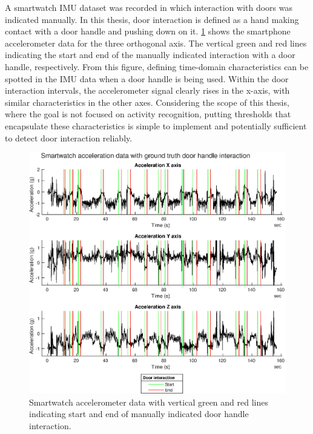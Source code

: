 A smartwatch \ac{IMU} dataset was recorded in which interaction with doors was indicated manually. In this thesis, door interaction is defined as a hand making contact with a door handle and pushing down on it.
\cref{fig:smartwatch_acc_with_gt_door_and_door_detect} shows the smartphone accelerometer data for the three orthogonal axis. The vertical green and red lines indicating the start and end of the manually indicated interaction with a door handle, respectively. From this figure, defining time-domain characteristics can be spotted in the \ac{IMU} data when a door handle is being used. Within the door interaction intervals, the accelerometer signal clearly rises in the x-axis, with similar characteristics in the other axes.  Considering the scope of this thesis, where the goal is not focused on activity recognition, putting thresholds that encapsulate these characteristics is simple to implement and potentially sufficient to detect door interaction reliably.

\begin{figure}[H]
	\centering
	\includegraphics[width=0.75\linewidth]{images/20201123_1010_Acceleration_Z_axis}
	\setlength{\belowcaptionskip}{-20pt}
	\caption{Smartwatch accelerometer data with vertical green and red lines indicating start and end of manually indicated door handle interaction.}
	\label{fig:smartwatch_acc_with_gt_door_and_door_detect}
\end{figure}


